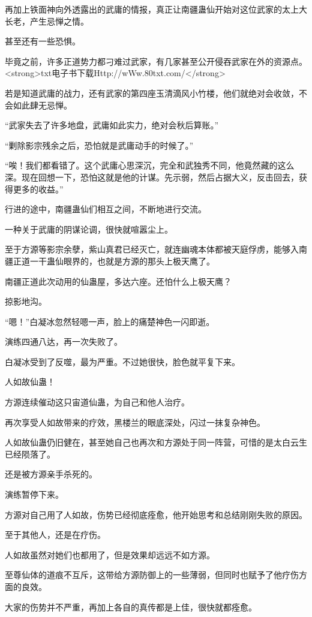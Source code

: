 \begin{this_body}
再加上铁面神向外透露出的武庸的情报，真正让南疆蛊仙开始对这位武家的太上大长老，产生忌惮之情。

甚至还有一些恐惧。

毕竟之前，许多正道势力都刁难过武家，有几家甚至公开侵吞武家在外的资源点。<strong>txt电子书下载Http://wWw.80txt.com/</strong>

若是知道武庸的战力，还有武家的第四座玉清滴风小竹楼，他们就绝对会收敛，不会如此肆无忌惮。

“武家失去了许多地盘，武庸如此实力，绝对会秋后算账。”

“剿除影宗残余之后，恐怕就是武庸动手的时候了。”

“唉！我们都看错了。这个武庸心思深沉，完全和武独秀不同，他竟然藏的这么深。现在回想一下，恐怕这就是他的计谋。先示弱，然后占据大义，反击回去，获得更多的收益。”

行进的途中，南疆蛊仙们相互之间，不断地进行交流。

一种关于武庸的阴谋论调，很快就喧嚣尘上。

至于方源等影宗余孽，紫山真君已经灭亡，就连幽魂本体都被天庭俘虏，能够入南疆正道一干蛊仙眼界的，也就是方源的那头上极天鹰了。

南疆正道此次动用的仙蛊屋，多达六座。还怕什么上极天鹰？

掠影地沟。

“嗯！”白凝冰忽然轻嗯一声，脸上的痛楚神色一闪即逝。

演练四通八达，再一次失败了。

白凝冰受到了反噬，最为严重。不过她很快，脸色就平复下来。

人如故仙蛊！

方源连续催动这只宙道仙蛊，为自己和他人治疗。

再次享受人如故带来的疗效，黑楼兰的眼底深处，闪过一抹复杂神色。

人如故仙蛊仍旧健在，甚至她自己也再次和方源处于同一阵营，可惜的是太白云生已经陨落了。

还是被方源亲手杀死的。

演练暂停下来。

方源对自己用了人如故，伤势已经彻底痊愈，他开始思考和总结刚刚失败的原因。

至于其他人，还是在疗伤。

人如故虽然对她们也都用了，但是效果却远远不如方源。

至尊仙体的道痕不互斥，这带给方源防御上的一些薄弱，但同时也赋予了他疗伤方面的良效。

大家的伤势并不严重，再加上各自的真传都是上佳，很快就都痊愈。


\end{this_body}
